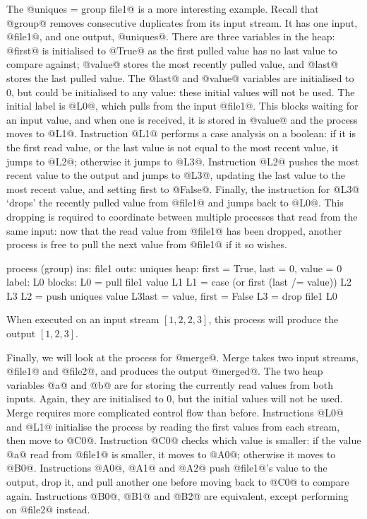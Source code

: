 The @uniques = group file1@ is a more interesting example.
Recall that @group@ removes consecutive duplicates from its input stream.
It has one input, @file1@, and one output, @uniques@.
There are three variables in the heap: @first@ is initialised to @True@ as the first pulled value has no last value to compare against; @value@ stores the most recently pulled value, and @last@ stores the last pulled value.
The @last@ and @value@ variables are initialised to $0$, but could be initialised to any value: these initial values will not be used.
The initial label is @L0@, which pulls from the input @file1@. This blocks waiting for an input value, and when one is received, it is stored in @value@ and the process moves to @L1@.
Instruction @L1@ performs a case analysis on a boolean: if it is the first read value, or the last value is not equal to the most recent value, it jumps to @L2@; otherwise it jumps to @L3@.
Instruction @L2@ pushes the most recent value to the output and jumps to @L3@, updating the last value to the most recent value, and setting first to @False@.
Finally, the instruction for @L3@ `drops' the recently pulled value from @file1@ and jumps back to @L0@.
This dropping is required to coordinate between multiple processes that read from the same input: now that the read value from @file1@ has been dropped, another process is free to pull the next value from @file1@ if it so wishes.

\begin{code}
process (group)
     ins: file1
    outs: uniques
    heap: {first = True, last = 0, value = 0}
   label: L0
  blocks: L0 = pull file1   value               L1
          L1 = case (or first (last /= value))  L2               L3
          L2 = push uniques value               L3{last = value, first = False}
          L3 = drop file1                       L0
\end{code}

When executed on an input stream $[1, 2, 2, 3]$, this process will produce the output $[1, 2, 3]$.

Finally, we will look at the process for @merge@.
Merge takes two input streams, @file1@ and @file2@, and produces the output @merged@.
The two heap variables @a@ and @b@ are for storing the currently read values from both inputs.
Again, they are initialised to $0$, but the initial values will not be used.
Merge requires more complicated control flow than before.
Instructions @L0@ and @L1@ initialise the process by reading the first values from each stream, then move to @C0@.
Instruction @C0@ checks which value is smaller: if the value @a@ read from @file1@ is smaller, it moves to @A0@; otherwise it moves to @B0@.
Instructions @A0@, @A1@ and @A2@ push @file1@'s value to the output, drop it, and pull another one before moving back to @C0@ to compare again.
Instructions @B0@, @B1@ and @B2@ are equivalent, except performing on @file2@ instead.

